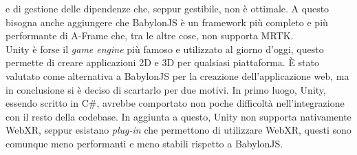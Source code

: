 e di gestione delle dipendenze che, seppur gestibile, non è ottimale. A questo bisogna anche aggiungere che BabylonJS è un framework più completo e più performante di A-Frame che,
tra le altre cose, non supporta MRTK.\\
Unity è forse il \textit{game engine} più famoso e utilizzato al giorno d'oggi, questo permette di creare applicazioni 2D e 3D per qualsiasi piattaforma. È stato valutato come
alternativa a BabylonJS per la creazione dell'applicazione web, ma in conclusione si è deciso di scartarlo per due motivi. In primo luogo, Unity, essendo scritto in C\#, avrebbe
comportato non poche difficoltà nell'integrazione con il resto della codebase. In aggiunta a questo, Unity non supporta nativamente WebXR, seppur esistano \textit{plug-in} che permettono
di utilizzare WebXR, questi sono comunque meno performanti e meno stabili rispetto a BabylonJS.\\

